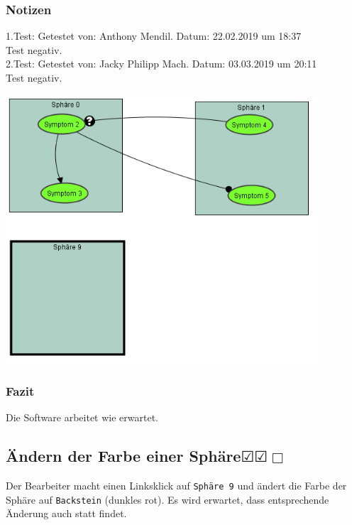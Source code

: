 \documentclass[enabledeprecatedfontcommands]{scrartcl}
\newcommand{\subsectiont}[2]{\subsection[#1]{#1{\normalsize\normalfont #2}}}
\newcommand{\leer}{$\Box$}
\newcommand{\ok}{$\CheckedBox$}
\begin{document}
\subsubsection{Notizen}
1.Test: Getestet von: Anthony Mendil. Datum: 22.02.2019 um 18:37 \\
Test negativ.\\
2.Test: Getestet von: Jacky Philipp Mach. Datum: 03.03.2019 um 20:11 \\
Test negativ. 
\begin{center}
\includegraphics[height=10cm]{2_13.PNG}
\end{center}
\subsubsection{Fazit}
Die Software arbeitet wie erwartet.

\subsectiont{Ändern der Farbe einer Sphäre}{\dotfill\ok\ok\leer}
Der Bearbeiter macht einen Linksklick auf \texttt{Sphäre 9} und ändert die Farbe der Sphäre auf \texttt{Backstein} (dunkles rot). Es wird erwartet, dass entsprechende Änderung auch statt findet. 
\end{document}
